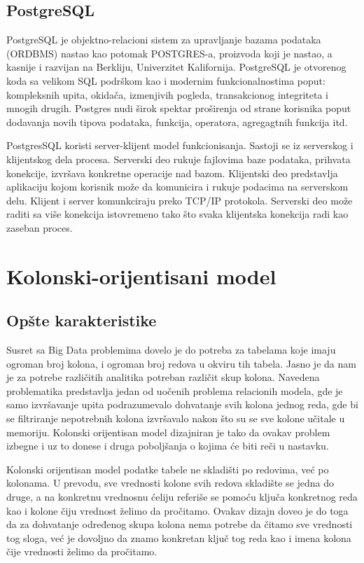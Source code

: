 \documentclass[12pt,oneside]{memoir}
\begin{document}
\subsection{PostgreSQL}


PostgreSQL je objektno-relacioni sistem za upravljanje bazama podataka (ORDBMS) nastao kao potomak POSTGRES-a, proizvoda koji je nastao, a kasnije i razvijan na Berkliju, Univerzitet Kalifornija. PostgreSQL je otvorenog koda sa velikom SQL podrškom kao i modernim funkcionalnostima poput: kompleksnih upita, okidača, izmenjivih pogleda, transakcionog integriteta i mnogih drugih. Postgres nudi širok spektar proširenja od strane korisnika poput dodavanja novih tipova podataka, funkcija, operatora, agregagtnih funkcija itd. 

PostgresSQL koristi server-klijent model funkcionisanja. Sastoji se iz serverskog i klijentskog dela procesa. Serverski deo rukuje fajlovima baze podataka, prihvata konekcije, izvršava konkretne operacije nad bazom. Klijentski deo predstavlja aplikaciju kojom korisnik može da komunicira i rukuje podacima na serverskom delu. Klijent i server komunkciraju preko TCP/IP protokola. Serverski deo može raditi sa više konekcija istovremeno tako što svaka klijentska konekcija radi kao zaseban proces.

\section{Kolonski-orijentisani model}
\subsection{Opšte karakteristike}
\cite{ColumnarOriented}
Susret sa Big Data problemima dovelo je do potreba za tabelama koje imaju ogroman broj kolona, i ogroman broj redova u okviru tih tabela. Jasno je da nam je za potrebe različitih analitika potreban različit skup kolona. Navedena problematika predstavlja jedan od uočenih problema relacionih modela, gde je samo izvršavanje upita podrazumevalo dohvatanje svih kolona jednog reda, gde bi se filtriranje nepotrebnih kolona izvršavalo nakon što su se sve kolone učitale u memoriju. Kolonski orijentisan model dizajniran je tako da ovakav problem izbegne i uz to donese i druga poboljšanja o kojima će biti reči u nastavku.

Kolonski orijentisan model podatke tabele ne skladišti po redovima, već po kolonama. U prevodu, sve vrednosti kolone svih redova skladište se jedna do druge, a na konkretnu vrednosnu ćeliju referiše se pomoću ključa konkretnog reda kao i kolone čiju vrednost želimo da pročitamo. Ovakav dizajn doveo je do toga da za dohvatanje određenog skupa kolona nema potrebe da čitamo sve vrednosti tog sloga, već je dovoljno da znamo konkretan ključ tog reda kao i imena kolona čije vrednosti želimo da pročitamo.
\end{document}
